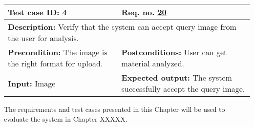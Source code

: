 \begin{table}[H]
\begin{tabular}{|p{7cm}|p{7cm}|}
\hline
\rowcolor[HTML]{D8E9F7} 
\textbf{Test case ID: 4}& \textbf{Req. no. \hyperlink{req:20}{20}}\\ \hline

\multicolumn{2}{|p{14cm}|}{\textbf{Description:} \newline Verify that the system can accept query image from the user for analysis.} \\ \hline

\textbf{Precondition:} \newline The image is the right format for upload.& 
\textbf{Postconditions:} \newline User can get material analyzed.\\ \hline

\textbf{Input:} \newline
Image&
\textbf{Expected output:} \newline
The system successfully accept the query image.\\ \hline
\end{tabular}
\end{table}

The requirements and test cases presented in this Chapter will be used to evaluate the system in Chapter XXXXX.